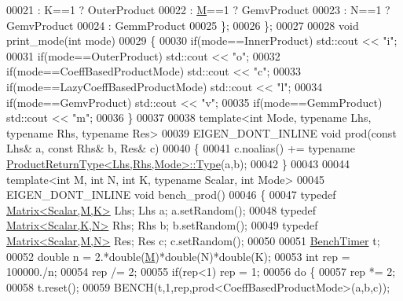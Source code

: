 \begin{DoxyCode}
00021         : K==1 ? OuterProduct
00022         : \hyperlink{group___core___module_class_eigen_1_1_matrix}{M}==1 ? GemvProduct
00023         : N==1 ? GemvProduct
00024         : GemmProduct
00025   \};
00026 \};
00027         
00028 \textcolor{keywordtype}{void} print\_mode(\textcolor{keywordtype}{int} mode)
00029 \{
00030   \textcolor{keywordflow}{if}(mode==InnerProduct) std::cout << \textcolor{stringliteral}{"i"};
00031   \textcolor{keywordflow}{if}(mode==OuterProduct) std::cout << \textcolor{stringliteral}{"o"};
00032   \textcolor{keywordflow}{if}(mode==CoeffBasedProductMode) std::cout << \textcolor{stringliteral}{"c"};
00033   \textcolor{keywordflow}{if}(mode==LazyCoeffBasedProductMode) std::cout << \textcolor{stringliteral}{"l"};
00034   \textcolor{keywordflow}{if}(mode==GemvProduct) std::cout << \textcolor{stringliteral}{"v"};
00035   \textcolor{keywordflow}{if}(mode==GemmProduct) std::cout << \textcolor{stringliteral}{"m"};
00036 \}
00037 
00038 \textcolor{keyword}{template}<\textcolor{keywordtype}{int} Mode, \textcolor{keyword}{typename} Lhs, \textcolor{keyword}{typename} Rhs, \textcolor{keyword}{typename} Res>
00039 EIGEN\_DONT\_INLINE \textcolor{keywordtype}{void} prod(\textcolor{keyword}{const} Lhs& a, \textcolor{keyword}{const} Rhs& b, Res& c)
00040 \{
00041   c.noalias() += \textcolor{keyword}{typename} \hyperlink{struct_eigen_1_1_product_return_type}{ProductReturnType<Lhs,Rhs,Mode>::Type}(a,b);
00042 \}
00043 
00044 \textcolor{keyword}{template}<\textcolor{keywordtype}{int} M, \textcolor{keywordtype}{int} N, \textcolor{keywordtype}{int} K, \textcolor{keyword}{typename} Scalar, \textcolor{keywordtype}{int} Mode>
00045 EIGEN\_DONT\_INLINE \textcolor{keywordtype}{void} bench\_prod()
00046 \{
00047   \textcolor{keyword}{typedef} \hyperlink{group___core___module_class_eigen_1_1_matrix}{Matrix<Scalar,M,K>} Lhs; Lhs a; a.setRandom();
00048   \textcolor{keyword}{typedef} \hyperlink{group___core___module_class_eigen_1_1_matrix}{Matrix<Scalar,K,N>} Rhs; Rhs b; b.setRandom();
00049   \textcolor{keyword}{typedef} \hyperlink{group___core___module_class_eigen_1_1_matrix}{Matrix<Scalar,M,N>} Res; Res c; c.setRandom();
00050 
00051   \hyperlink{class_eigen_1_1_bench_timer}{BenchTimer} t;
00052   \textcolor{keywordtype}{double} n = 2.*double(\hyperlink{group___core___module_class_eigen_1_1_matrix}{M})*double(N)*double(K);
00053   \textcolor{keywordtype}{int} rep = 100000./n;
00054   rep /= 2;
00055   \textcolor{keywordflow}{if}(rep<1) rep = 1;
00056   \textcolor{keywordflow}{do} \{
00057     rep *= 2;
00058     t.reset();
00059     BENCH(t,1,rep,prod<CoeffBasedProductMode>(a,b,c));

\end{DoxyCode}
